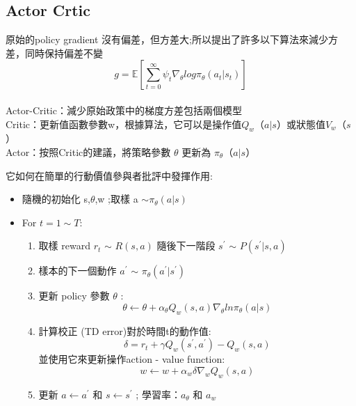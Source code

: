 \documentclass[14pt,a4paper]{report}  %
\begin{document}
\subsection{Actor Crtic}
原始的policy gradient 沒有偏差，但方差大;所以提出了許多以下算法來減少方差，同時保持偏差不變\\[5pt]
$$g = \mathbb{E}[\sum_{t=0}^\infty\psi_t\nabla_\theta log\pi_\theta(a_t \vert s_t)]$$\\[5pt]
Actor-Critic：減少原始政策中的梯度方差包括兩個模型\\[5pt]
Critic：更新值函數參數w，根據算法，它可以是操作值$ Q_w$（$a \vert s$）或狀態值$V_w$（$s$） \\[5pt]
Actor：按照Critic的建議，將策略參數 $\theta$ 更新為 $\pi_\theta$（$a \vert s$）\\[5pt]
\begin{Large}
它如何在簡單的行動價值參與者批評中發揮作用:
\end{Large}
\begin{itemize}
\item 隨機的初始化 s,$\theta$,w ;取樣 a $\sim
\pi_\theta(a \vert s)$
\end{itemize}
\begin{itemize}
\item For $t =1 \sim T:$ 
\begin{enumerate}[1]
      \item 取樣 reward $r_t$ $\sim$ $R(s,a)$ 隨後下一階段 $s^{'}$ $\sim$ $P(s^{'}\vert s,a)$ 
      \item 樣本的下一個動作 $a^{'}$ $\sim$ $\pi_\theta(a^{'}\vert s^{'})$
    
       \item 更新 policy 參數 $\theta$ :\\
       $$\theta\leftarrow\theta+\alpha_\theta Q_w(s,a)\nabla_\theta ln\pi_\theta(a\vert s)$$
       \item 計算校正 (TD error)對於時間t的動作值:\\
       $$\delta = r_t + \gamma Q_w(s^{'},a^{'})-Q_w(s,a)$$並使用它來更新操作action - value function:\\
       $$w\leftarrow w+\alpha_w \delta \nabla_w Q_w(s,a) $$
       \item 更新 $a\leftarrow a^{'}$ 和 $ s \leftarrow s^{'}$ ; 學習率：$a_\theta$ 和 $a_w$
    \end{enumerate}   
\end{itemize}\newpage
\end{document}
